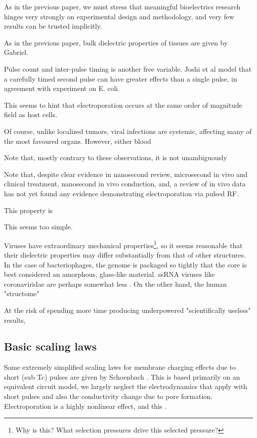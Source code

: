 \documentclass[fleqn,10pt]{article}
\begin{document}
As in the previous paper, we must stress that meaningful bioelectrics research hinges very strongly on experimental design and methodology, and very few results can be trusted implicitly.


As in the previous paper, bulk dielectric properties of tissues are given by Gabriel. 



Pulse count and inter-pulse timing is another free variable. Joshi et al \cite{Selfconsistent2001} model that a carefully timed second pulse can have greater effects than a single pulse, in agreement with experiment on E. coli.

This seems to hint that electroporation occurs at the same order of magnitude field as host cells.

Of course, unlike localized tumors, viral infections are systemic, affecting many of the most favoured organs. However, either blood 

Note that, mostly contrary to these observations, it is not unambiguously 

Note that, despite clear evidence in nanosecond review, microsecond in vivo and clinical treatment, nanosecond in vivo conduction, and, a review of in vivo data has not yet found any evidence demonstrating electroporation via pulsed RF. 

This property is 
\cite{Nanosecond2006b} 

This seems too simple.

Viruses have extraordinary mechanical properties\footnote{Why is this? What selection pressures drive this selected pressure?}, so it seems reasonable that their dielectric properties may differ substantially from that of other structures. In the case of bacteriophages, the genome is packaged so tightly that the core is best considered an amorphous, glass-like material. ssRNA viruses like coronaviridae are perhaps somewhat less . On the other hand, the human "structome" 



At the risk of spending more time producing underpowered "scientifically useless" results, 

\subsection*{Basic scaling laws}

Some extremely simplified scaling laws for membrane charging effects due to short (sub Tc) pulses are given by Schoenbach \cite{Bioelectric2007}. This is based primarily on an equivalent circuit model, we largely neglect the electrodynamics that apply with short pulses and also the conductivity change due to pore formation. Electroporation is a highly nonlinear effect\cite{Letter1974}, and this .
\end{document}
